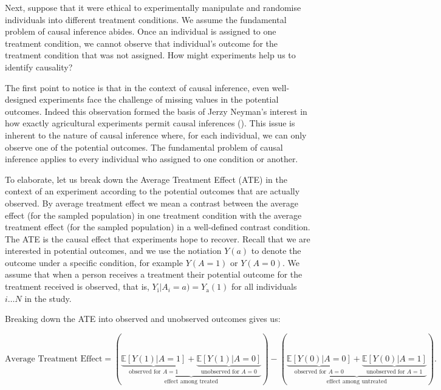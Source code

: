 \documentclass[
  singlecolumn]{article}
\begin{document}
Next, suppose that it were ethical to experimentally manipulate and
randomise individuals into different treatment conditions. We assume the
fundamental problem of causal inference abides. Once an individual is
assigned to one treatment condition, we cannot observe that individual's
outcome for the treatment condition that was not assigned. How might
experiments help us to identify causality?

The first point to notice is that in the context of causal inference,
even well-designed experiments face the challenge of missing values in
the potential outcomes. Indeed this observation formed the basis of
Jerzy Neyman's interest in how exactly agricultural experiments permit
causal inferences (). This issue
is inherent to the nature of causal inference where, for each
individual, we can only observe one of the potential outcomes. The
fundamental problem of causal inference applies to every individual who
assigned to one condition or another.

To elaborate, let us break down the Average Treatment Effect (ATE) in
the context of an experiment according to the potential outcomes that
are actually observed. By average treatment effect we mean a contrast
between the average effect (for the sampled population) in one treatment
condition with the average treatment effect (for the sampled population)
in a well-defined contrast condition. The ATE is the causal effect that
experiments hope to recover. Recall that we are interested in potential
outcomes, and we use the notiation \(Y(a)\) to denote the outcome under
a specific condition, for example \(Y(A=1)\) or \(Y(A=0)\). We assume
that when a person receives a treatment their potential outcome for the
treatment received is observed, that is,
\(Y_{\text{i}}|A_i = a) = Y_{\text{a}}(1)\) for all individuals
\(i\dots N\) in the study.

Breaking down the ATE into observed and unobserved outcomes gives us:

\[
\text{Average Treatment Effect} = \left(\underbrace{\underbrace{\mathbb{E}[Y(1)|A = 1]}_{\text{observed for } A = 1} + \underbrace{\mathbb{E}[Y(1)|A = 0]}_{\text{unobserved for } A = 0}}_{\text{effect among treated}}\right) - \left(\underbrace{\underbrace{\mathbb{E}[Y(0)|A = 0]}_{\text{observed for } A = 0} + \underbrace{\mathbb{E}[Y(0)|A = 1]}_{\text{unobserved for } A = 1}}_{\text{effect among untreated}}\right).
\]
\end{document}
